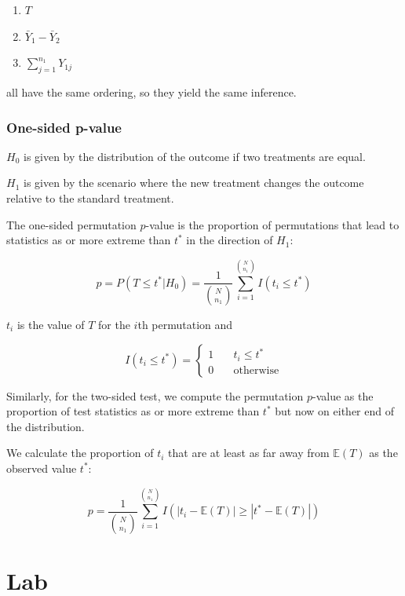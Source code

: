 \documentclass[
  letterpaper,
  DIV=11,
  numbers=noendperiod]{scrreport}
\providecommand{\tightlist}{%
  \setlength{\itemsep}{0pt}\setlength{\parskip}{0pt}}\usepackage{longtable,booktabs,array}
\begin{document}
\begin{enumerate}
\def\labelenumi{\arabic{enumi}.}
\tightlist
\item
  \(T\)
\item
  \(\bar Y_1 - \bar Y_2\)
\item
  \(\sum_{j=1}^{n_1} Y_{1j}\)
\end{enumerate}

all have the same ordering, so they yield the same inference.

\hypertarget{one-sided-p-value}{%
\subsection{One-sided p-value}\label{one-sided-p-value}}

\(H_0\) is given by the distribution of the outcome if two treatments
are equal.

\(H_1\) is given by the scenario where the new treatment changes the
outcome relative to the standard treatment.

The one-sided permutation \(p\)-value is the proportion of permutations
that lead to statistics as or more extreme than \(t^*\) in the direction
of \(H_1\):

\[
p = P(T \leq t^* | H_0) = \frac{1}{N \choose n_1} \sum_{i=1}^{N \choose n_1} I(t_i \leq t^*)
\]

\(t_i\) is the value of \(T\) for the \(i\)th permutation and

\[
I(t_i \leq t^*) = \left\{ 
  \begin{array}{ll}
  1 \quad & t_i \leq t^* \\ 
  0 & \text{otherwise}
  \end{array}
  \right.
  \]

Similarly, for the two-sided test, we compute the permutation
\(p\)-value as the proportion of test statistics as or more extreme than
\(t^*\) but now on either end of the distribution.

We calculate the proportion of \(t_i\) that are at least as far away
from \(\mathbb E(T)\) as the observed value \(t^*\):

\[
p = \frac{1}{N \choose n_1} \sum_{i=1}^{N \choose n_1} I(|t_i - \mathbb E(T)| \geq |t^* - \mathbb E(T)|)
\]


\hypertarget{lab-3}{%
\chapter{Lab}\label{lab-3}}
\end{document}
